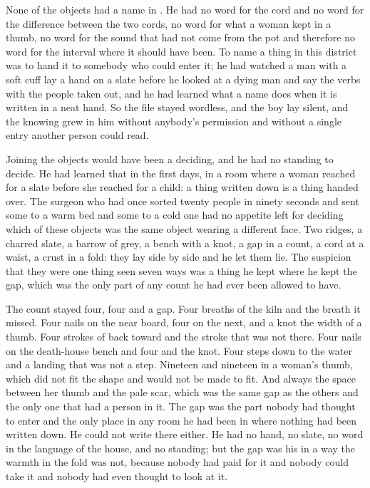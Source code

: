 None of the objects had a name in . He had no word for the cord and no word for the difference between the two cords, no word for what a woman kept in a thumb, no word for the sound that had not come from the pot and therefore no word for the interval where it should have been. To name a thing in this district was to hand it to somebody who could enter it; he had watched a man with a soft cuff lay a hand on a slate before he looked at a dying man and say the verbs with the people taken out, and he had learned what a name does when it is written in a neat hand. So the file stayed wordless, and the boy lay silent, and the knowing grew in him without anybody's permission and without a single entry another person could read.

Joining the objects would have been a deciding, and he had no standing to decide. He had learned that in the first days, in a room where a woman reached for a slate before she reached for a child: a thing written down is a thing handed over. The surgeon who had once sorted twenty people in ninety seconds and sent some to a warm bed and some to a cold one had no appetite left for deciding which of these objects was the same object wearing a different face. Two ridges, a charred slate, a barrow of grey, a bench with a knot, a gap in a count, a cord at a waist, a crust in a fold: they lay side by side and he let them lie. The suspicion that they were one thing seen seven ways was a thing he kept where he kept the gap, which was the only part of any count he had ever been allowed to have.

The count stayed four, four and a gap. Four breaths of the kiln and the breath it missed. Four nails on the near board, four on the next, and a knot the width of a thumb. Four strokes of  back toward  and the stroke that was not there. Four nails on the death-house bench and four and the knot. Four steps down to the water and a landing that was not a step. Nineteen and nineteen in a woman's thumb, which did not fit the shape and would not be made to fit. And always the space between her thumb and the pale scar, which was the same gap as the others and the only one that had a person in it. The gap was the part nobody had thought to enter and the only place in any room he had been in where nothing had been written down. He could not write there either. He had no hand, no slate, no word in the language of the house, and no standing; but the gap was his in a way the warmth in the fold was not, because nobody had paid for it and nobody could take it and nobody had even thought to look at it.

